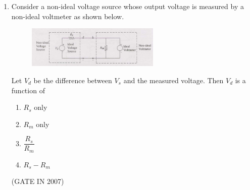\documentclass[journal]{IEEEtran}
\begin{document}
\begin{enumerate}
\item Consider a non-ideal voltage source whose output voltage is measured by a non-ideal voltmeter as shown below. 
\begin{figure}[H]
    \centering
      \includegraphics[width=0.6\textwidth]{14.jpg} 
      \caption{}
    \label{fig:fig14} 
\end{figure}
Let $V_d$ be the difference between $V_s$ and the measured voltage. Then $V_d$ is a function of  
\begin{multicols}{2}
\begin{enumerate}
\item $R_s$ only  
\item $R_m$ only  
\item $\dfrac{R_s}{R_m}$  
\item $R_s - R_m$  
\end{enumerate}
\end{multicols}
\hfill(GATE IN 2007)


\end{enumerate}
\end{document}
